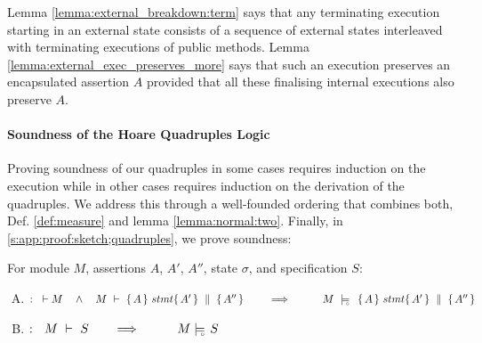 Lemma \ref{lemma:external_breakdown:term} %
says that any terminating execution 
 starting in an external state  consists of a  sequence of  external states interleaved with terminating executions
  of public methods.
Lemma  \ref{lemma:external_exec_preserves_more} says that such an execution preserves an encapsulated assertion $A$  
provided that all these finalising internal executions  %
also preserve $A$.
% 
  



\paragraph{ Soundness of the Hoare Quadruples Logic}

Proving soundness of our quadruples in  some cases  requires  induction on the execution while in other cases  requires induction on the derivation of the quadruples.  We address this   through  a well-founded ordering that combines both, \cf 
\label{sect:prove:wellfounded}
\label{sect:prove:sound:quadruples}
  Def.  \ref{def:measure}  and  lemma \ref{lemma:normal:two}. 
  Finally, in \ref{s:app:proof:sketch;quadruples}, we prove soundness:
 

\begin{theorem}
\label{t:quadruple:sound}
\label{thm:soundness}
For module  $M$,   assertions $A$, $A'$, $A''$,   state  $\sigma$, and specification $S$:

\begin{enumerate}[(A)]
\item
 $:\strut \   \vdash M  \ \ \ \wedge \ \ \  M\ \vdash\  \quadruple {A} {stmt} {A'} {A''}  \ \ \ \ \ \ \ \Longrightarrow \ \ \ \ \ \  \ \ \  M\ \modelsD\  \quadruple {A} {stmt} {A'} {A''}$
 \item
  $:\strut \  \  \proves{M}{S}\ \ \ \ \ \ \Longrightarrow\ \ \ \ \ \  \ \ \ {M} \modelsD {S}$
 
\end{enumerate}

\end{theorem}

